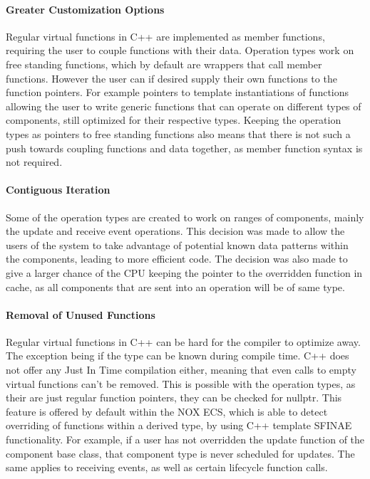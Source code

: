 \paragraph{Greater Customization Options}
Regular virtual functions in C++ are implemented as member functions, requiring the user to couple functions with their data.
Operation types work on free standing functions, which by default are wrappers that call member functions.
However the user can if desired supply their own functions to the function pointers. For example pointers to template
instantiations of functions allowing the user to write generic functions that can operate on different types of components,
still optimized for their respective types.
Keeping the operation types as pointers to free standing functions also means that there is not such a push towards
coupling functions and data together, as member function syntax is not required.

\paragraph{Contiguous Iteration}
Some of the operation types are created to work on ranges of components, mainly the update and receive event operations.
This decision was made to allow the users of the system to take advantage of potential known data patterns within the components,
leading to more efficient code.
The decision was also made to give a larger chance of the CPU keeping the pointer to the overridden function in cache,
as all components that are sent into an operation will be of same type.

\paragraph{Removal of Unused Functions}
Regular virtual functions in C++ can be hard for the compiler to optimize away. The exception
being if the type can be known during compile time. C++ does not offer any Just In Time compilation either,
meaning that even calls to empty virtual functions can't be removed.
This is possible with the operation types, as their are just regular function pointers, they can be checked for nullptr.
This feature is offered by default within the NOX ECS, which is able to detect overriding of functions within a derived type,
by using C++ template SFINAE functionality. 
For example, if a user has not overridden the update function of the component base class, that component type is never scheduled
for updates. The same applies to receiving events, as well as certain lifecycle function calls.

